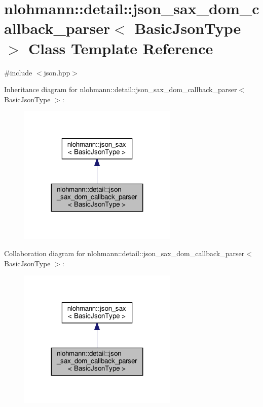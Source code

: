 \hypertarget{classnlohmann_1_1detail_1_1json__sax__dom__callback__parser}{}\section{nlohmann\+:\+:detail\+:\+:json\+\_\+sax\+\_\+dom\+\_\+callback\+\_\+parser$<$ Basic\+Json\+Type $>$ Class Template Reference}
\label{classnlohmann_1_1detail_1_1json__sax__dom__callback__parser}


{\ttfamily \#include $<$json.\+hpp$>$}



Inheritance diagram for nlohmann\+:\+:detail\+:\+:json\+\_\+sax\+\_\+dom\+\_\+callback\+\_\+parser$<$ Basic\+Json\+Type $>$\+:
\nopagebreak
\begin{figure}[H]
\begin{center}
\leavevmode
\includegraphics[width=215pt]{classnlohmann_1_1detail_1_1json__sax__dom__callback__parser__inherit__graph}
\end{center}
\end{figure}


Collaboration diagram for nlohmann\+:\+:detail\+:\+:json\+\_\+sax\+\_\+dom\+\_\+callback\+\_\+parser$<$ Basic\+Json\+Type $>$\+:
\nopagebreak
\begin{figure}[H]
\begin{center}
\leavevmode
\includegraphics[width=215pt]{classnlohmann_1_1detail_1_1json__sax__dom__callback__parser__coll__graph}
\end{center}
\end{figure}
